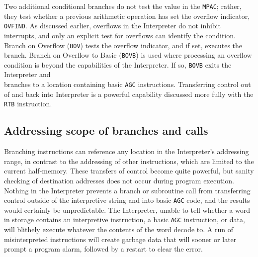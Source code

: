 \documentclass[refcap, oxford]{ahsan}
\begin{document}
Two additional conditional branches do not test the value in the \texttt{MPAC}; rather, they test whether a previous arithmetic operation has set the overflow indicator, \texttt{OVFIND}. As discussed earlier, overflows in the Interpreter do not inhibit interrupts, and only an explicit test for overflows can identify the condition. Branch on Overflow (\texttt{BOV}) tests the overflow indicator, and if set, executes the branch. Branch on Overflow to Basic (\texttt{BOVB}) is used where processing an overflow condition is beyond the capabilities of the Interpreter. If so, \texttt{BOVB} exits the Interpreter and\\
branches to a location containing basic \texttt{AGC} instructions. Transferring control out of and back into Interpreter is a powerful capability discussed more fully with the \texttt{RTB} instruction.


\subsection{Addressing scope of branches and calls}
Branching instructions can reference any location in the Interpreter's addressing range, in contrast to the addressing of other instructions, which are limited to the current half-memory. These transfers of control become quite powerful, but sanity checking of destination addresses does not occur during program execution. Nothing in the Interpreter prevents a branch or subroutine call from transferring control outside of the interpretive string and into basic \texttt{AGC} code, and the results would certainly be unpredictable. The Interpreter, unable to tell whether a word in storage contains an interpretive instruction, a basic \texttt{AGC} instruction, or data, will blithely execute whatever the contents of the word decode to. A run of misinterpreted instructions will create garbage data that will sooner or later prompt a program alarm, followed by a restart to clear the error.
\end{document}
